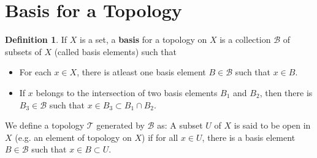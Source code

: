 \documentclass[12pt,reqno]{amsart}
\theoremstyle{plain}
\theoremstyle{definition}
\newtheorem{defn}{Definition}
\begin{document}
\section{Basis for a Topology}
\begin{defn}
    If $X$ is a set, a {\bf basis} for a topology on $X$ is a collection $\mathcal{B}$ of subsets of $X$ (called basis elements) such that
    \begin{itemize}
        \item For each $x \in X$, there is atleast one basis element $B \in \mathcal{B}$ such that $x \in B$.
        \item If $x$ belongs to the intersection of two basis elements $B_1$ and $B_2$, then there is $B_3 \in \mathcal{B}$ such that $x \in B_3 \subset B_1 \cap B_2$. 
    \end{itemize}
\end{defn}
We define a topology $\mathcal{T}$ generated by $\mathcal{B}$ as: A subset $U$ of $X$ is said to be open in $X$ (e.g. an element of topology on $X$) if for all $x \in U$, there is a basis element $B \in \mathcal{B}$ such that $x \in B \subset U$.
\end{document}
